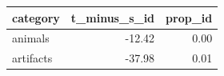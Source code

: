 \begin{table}[ht]
\centering
\begin{tabular}{lrr}
  \hline
category & t\_minus\_s\_id & prop\_id \\ 
  \hline
animals & -12.42 & 0.00 \\ 
  artifacts & -37.98 & 0.01 \\ 
   \hline
\end{tabular}
\end{table}
